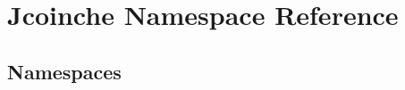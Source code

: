 \hypertarget{namespace_jcoinche}{}\section{Jcoinche Namespace Reference}
\label{namespace_jcoinche}
\subsection*{Namespaces}
\begin{DoxyCompactItemize}
\end{DoxyCompactItemize}
